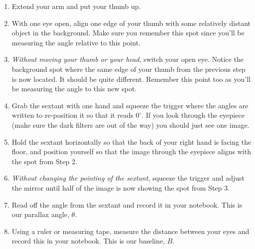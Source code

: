 \documentclass[11pt]{article}
\begin{document}
\begin{enumerate}[label=Step \arabic*:]
    \item Extend your arm and put your thumb up.
    
    \item With one eye open, align one edge of your thumb with some relatively distant object in the background. Make sure you remember this spot since you'll be measuring the angle relative to this point.
    
    \item \textsl{Without moving your thumb or your head}, switch your open eye. Notice the background spot where the same edge of your thumb from the previous step is now located. It should be quite different. Remember this point too as you'll be measuring the angle to this new spot. 
    
    \item Grab the sextant with one hand and squeeze the trigger where the angles are written to re-position it so that it reads $0^\circ$. If you look through the eyepiece (make sure the dark filters are out of the way) you should just see one image.
    
    \item Hold the sextant horizontally so that the back of your right hand is facing the floor, and position yourself so that the image through the eyepiece aligns with the spot from Step 2.
    
    \item \textsl{Without changing the pointing of the sextant}, squeeze the trigger and adjust the mirror until half of the image is now showing the spot from Step 3. 
    
    \item Read off the angle from the sextant and record it in your notebook. This is our parallax angle, $\theta$.
    
    \item Using a ruler or measuring tape, measure the distance between your eyes and record this in your notebook. This is our baseline, $B$.
    
\end{enumerate}
\end{document}
